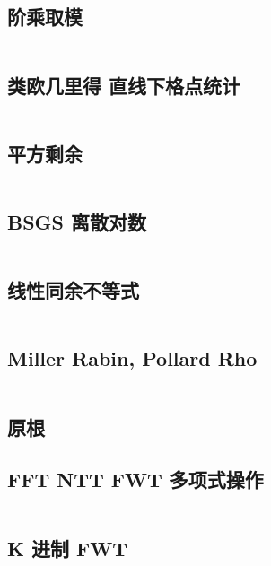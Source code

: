 \documentclass[titlepage, a4paper]{article}
\begin{document}
\begin{multicols}{2}
\begin{spacing}{0.6}
				\subsection{阶乘取模}
				\inputminted{cpp}{src/Math/Factorial Mod.cpp}
				\subsection{类欧几里得 直线下格点统计 \checkmark}
				\inputminted{cpp}{src/Math/直线下格点统计.cpp}
				\subsection{平方剩余}
				\inputminted{cpp}{src/Math/平方剩余.cpp}
				\subsection{BSGS 离散对数}
				\inputminted{cpp}{src/Math/BSGS.cpp}
				\subsection{线性同余不等式}
				\inputminted{cpp}{src/Math/线性同余不等式.cpp}
				\subsection{Miller Rabin, Pollard Rho}
				\inputminted{cpp}{src/Math/Miller Rabin And Pollard Rho.cpp}
				\subsection{原根}
				
				\subsection{FFT NTT FWT 多项式操作}
				\inputminted{cpp}{src/Math/FFT NTT FWT.cpp}
				\subsection{K 进制 FWT}
				\inputminted{cpp}{src/tbr/fwt.cpp}
				
				\inputminted{cpp}{src/Math/Polynomial.cpp}
				

\end{spacing}
\end{multicols}
\end{document}
